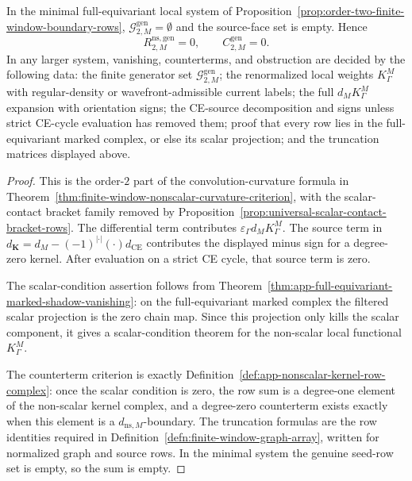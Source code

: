 \begin{prop}
  In the minimal full-equivariant local system of
  Proposition~\ref{prop:order-two-finite-window-boundary-rows},
  \(\mathcal G^{\mathrm{gen}}_{2,M}=\emptyset\) and the source-face set is
  empty.  Hence
  \[
    R^{\mathrm{ns,gen}}_{2,M}=0,
    \qquad
    C^{\mathrm{gen}}_{2,M}=0.
  \]
  In any larger system, vanishing, counterterms, and obstruction are
  decided by the following data:
  the finite generator set \(\mathcal G^{\mathrm{gen}}_{2,M}\); the
  renormalized local weights \(K^M_\Gamma\) with regular-density or
  wavefront-admissible current labels; the full \(d_M K^M_\Gamma\)
  expansion with orientation signs; the CE-source decomposition and signs
  unless strict CE-cycle evaluation has removed them; proof that every row
  lies in the full-equivariant marked complex, or else its scalar
  projection; and the truncation matrices displayed above.
\end{prop}

\begin{proof}
  This is the order-\(2\) part of the convolution-curvature formula in
  Theorem~\ref{thm:finite-window-nonscalar-curvature-criterion}, with
  the scalar-contact bracket family removed by
  Proposition~\ref{prop:universal-scalar-contact-bracket-rows}.  The
  differential term contributes \(\varepsilon_\Gamma d_M K^M_\Gamma\).  The
  source term in \(d_{\mathbf K}=d_M-(-1)^{|\cdot|}(\cdot)d_{\mathrm{CE}}\)
  contributes the displayed minus sign for a degree-zero kernel.  After
  evaluation on a strict CE cycle, that source term is zero.

  The scalar-condition assertion follows from
  Theorem~\ref{thm:app-full-equivariant-marked-shadow-vanishing}: on the
  full-equivariant marked complex the filtered scalar projection is the
  zero chain map.  Since this projection only kills the scalar component, it
  gives a scalar-condition theorem for the non-scalar local functional
  \(K^M_\Gamma\).

  The counterterm criterion is exactly
  Definition~\ref{def:app-nonscalar-kernel-row-complex}: once the scalar
  condition is zero, the row sum is a degree-one element of the non-scalar
  kernel complex, and a degree-zero counterterm exists exactly when this
  element is a \(d_{\mathrm{ns},M}\)-boundary.  The truncation formulas are
  the row identities required in
  Definition~\ref{defn:finite-window-graph-array}, written for normalized
  graph and source rows.  In the minimal system the genuine seed-row set
  is empty, so the sum is empty.
\end{proof}

